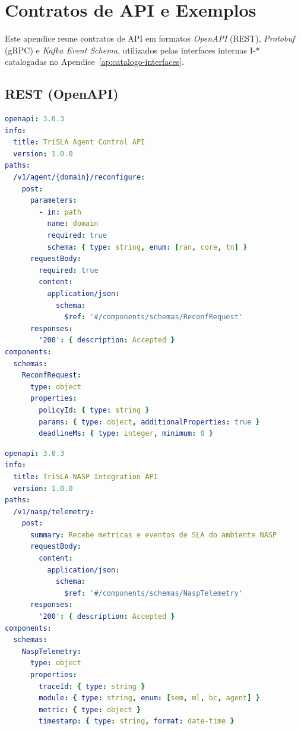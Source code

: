 \chapter{Contratos de API e Exemplos}
\label{ap:contratos-api}

Este apendice reune contratos de API em formatos \textit{OpenAPI} (REST), \textit{Protobuf} (gRPC) e \textit{Kafka Event Schema}, utilizados pelas interfaces internas I-* catalogadas no Apendice~\ref{ap:catalogo-interfaces}.  

\section{REST (OpenAPI)}
\label{ap:schemas-rest}

\begin{lstlisting}[language=YAML, caption={Esboco OpenAPI (I-06) para reconfiguracao por agente.}]
openapi: 3.0.3
info:
  title: TriSLA Agent Control API
  version: 1.0.0
paths:
  /v1/agent/{domain}/reconfigure:
    post:
      parameters:
        - in: path
          name: domain
          required: true
          schema: { type: string, enum: [ran, core, tn] }
      requestBody:
        required: true
        content:
          application/json:
            schema:
              $ref: '#/components/schemas/ReconfRequest'
      responses:
        '200': { description: Accepted }
components:
  schemas:
    ReconfRequest:
      type: object
      properties:
        policyId: { type: string }
        params: { type: object, additionalProperties: true }
        deadlineMs: { type: integer, minimum: 0 }
\end{lstlisting}

\begin{lstlisting}[language=YAML, caption={Esboco OpenAPI (I-07) TriSLA-NASP para integracao experimental.}]
openapi: 3.0.3
info:
  title: TriSLA-NASP Integration API
  version: 1.0.0
paths:
  /v1/nasp/telemetry:
    post:
      summary: Recebe metricas e eventos de SLA do ambiente NASP
      requestBody:
        content:
          application/json:
            schema:
              $ref: '#/components/schemas/NaspTelemetry'
      responses:
        '200': { description: Accepted }
components:
  schemas:
    NaspTelemetry:
      type: object
      properties:
        traceId: { type: string }
        module: { type: string, enum: [sem, ml, bc, agent] }
        metric: { type: object }
        timestamp: { type: string, format: date-time }
\end{lstlisting}

